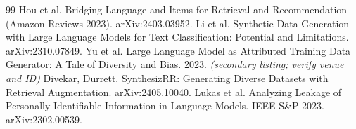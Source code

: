 \documentclass[11pt,a4paper]{article}
\begin{document}
\begin{thebibliography}{99}
 Hou et al. Bridging Language and Items for Retrieval and Recommendation (Amazon Reviews 2023). arXiv:2403.03952.
 Li et al. Synthetic Data Generation with Large Language Models for Text Classification: Potential and Limitations. arXiv:2310.07849.
 Yu et al. Large Language Model as Attributed Training Data Generator: A Tale of Diversity and Bias. 2023. \textit{(secondary listing; verify venue and ID)}
 Divekar, Durrett. SynthesizRR: Generating Diverse Datasets with Retrieval Augmentation. arXiv:2405.10040.
 Lukas et al. Analyzing Leakage of Personally Identifiable Information in Language Models. IEEE S\&P 2023. arXiv:2302.00539.
\end{thebibliography}
\end{document}

